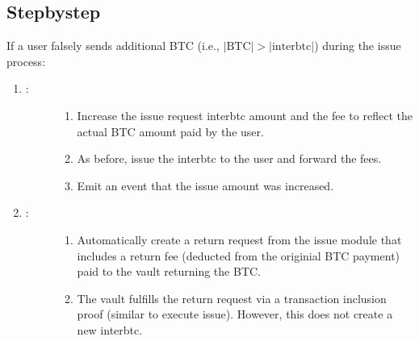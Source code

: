 \documentclass[a4paper,10pt,english]{sphinxmanual}
\begin{document}
\subsection{Step\sphinxhyphen{}by\sphinxhyphen{}step}
\label{\detokenize{spec/refund:step-by-step}}
If a user falsely sends additional BTC (i.e., \(|\text{BTC}| > |\text{interbtc}|\)) during the issue process:
\begin{enumerate}
%
\item {} \begin{description}
\item[{:}] \leavevmode\begin{enumerate}
%
\item {} 
Increase the issue request interbtc amount and the fee to reflect the actual BTC amount paid by the user.

\item {} 
As before, issue the interbtc to the user and forward the fees.

\item {} 
Emit an event that the issue amount was increased.

\end{enumerate}

\end{description}

\item {} \begin{description}
\item[{:}] \leavevmode\begin{enumerate}
%
\item {} 
Automatically create a return request from the issue module that includes a return fee (deducted from the originial BTC payment) paid to the vault returning the BTC.

\item {} 
The vault fulfills the return request via a transaction inclusion proof (similar to execute issue). However, this does not create a new interbtc.

\end{enumerate}

\end{description}

\end{enumerate}
\end{document}
